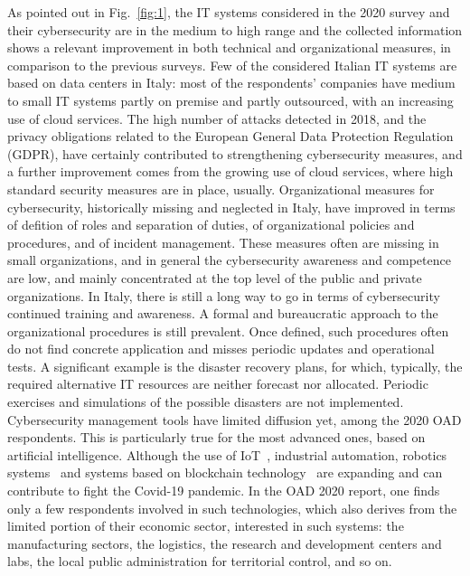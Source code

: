 \documentclass{easychair}
\begin{document}
As pointed out in Fig.~\ref{fig:1}, the IT systems considered in the 2020 survey and their cybersecurity are in the medium to high range and the collected information shows a relevant 
improvement in both technical and organizational measures, in comparison to the previous surveys. Few of the considered Italian IT systems are based on data centers in 
Italy: most of the respondents' companies have medium to small IT systems partly on premise and partly outsourced, with an increasing use of cloud services.
The high number of attacks detected in 2018, and the privacy obligations related to the European
General Data Protection Regulation (GDPR), have certainly contributed to strengthening cybersecurity measures, and a further improvement 
comes from the growing use of cloud services, where high standard security measures are in place, usually. Organizational measures for cybersecurity, historically missing and neglected
in Italy, have improved in terms of defition of roles and separation of duties, of organizational policies and procedures, and of incident management. These measures often are missing
in small organizations, and in general the cybersecurity awareness and competence are low, and mainly concentrated at the top level of the public and private organizations. In Italy, there is 
still a long way to go in terms of cybersecurity continued training and awareness. A formal and bureaucratic approach to the organizational procedures is still prevalent. Once defined,
such procedures often do not find concrete application and misses periodic updates and operational tests. A significant example is the disaster recovery plans, for 
which, typically, the required alternative IT resources are neither forecast nor allocated. Periodic exercises and simulations of the 
possible disasters are not implemented. Cybersecurity management tools have limited diffusion yet, among the 2020 OAD respondents. This is particularly true for
the most advanced ones, based on artificial intelligence.
Although the use of IoT~\cite{JK21}, industrial automation, robotics systems~\cite{SGLMDXHKCZT21} and systems based on blockchain technology~\cite{RMFF21}
are expanding and can contribute to fight the Covid-19 pandemic.
In the OAD 2020 report, one finds only a few respondents involved in such technologies, which also derives from the limited portion
of their economic sector, interested in such systems: the manufacturing sectors, the logistics, the research and 
development centers and labs, the local public administration for territorial control, and so on.
\end{document}
